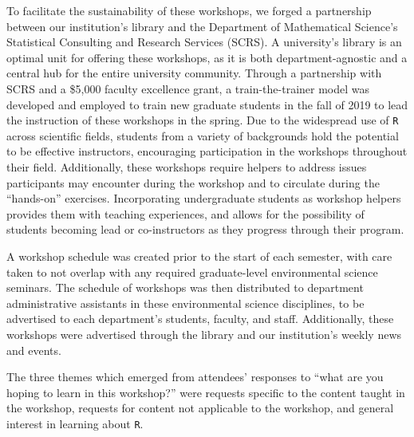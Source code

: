 \documentclass[12pt]{article}
\begin{document}
\quad To facilitate the sustainability of these workshops, we forged a partnership between our institution's library and the Department of Mathematical Science's Statistical Consulting and Research Services (SCRS). A university's library is an optimal unit for offering these workshops, as it is both department-agnostic and a central hub for the entire university community. Through a partnership with SCRS and a \$5,000 faculty excellence grant, a train-the-trainer model was developed and employed to train new graduate students in the fall of 2019 to lead the instruction of these workshops in the spring. Due to the widespread use of \texttt{R} across scientific fields, students from a variety of backgrounds hold the potential to be effective instructors,  encouraging participation in the workshops throughout their field. Additionally, these workshops require helpers to address issues participants may encounter during the workshop and to circulate during the ``hands-on'' exercises. Incorporating undergraduate students as workshop helpers provides them with teaching experiences, and allows for the possibility of students becoming lead or co-instructors as they progress through their program. 


A workshop schedule was created prior to the start of each 
semester, with care taken to not overlap with any required graduate-level
environmental science seminars. The schedule of workshops was then distributed
to department administrative assistants in these environmental science
disciplines, to be advertised to each department's students, faculty, and staff.
Additionally, these workshops were advertised through the library and our
institution's weekly news and events.







\quad The three themes which emerged from attendees' responses to ``what are you
hoping to learn in this workshop?''  were requests specific to the content
taught in the workshop, requests for content not applicable to the workshop, 
and general interest in learning about \texttt{R}. 
\end{document}
